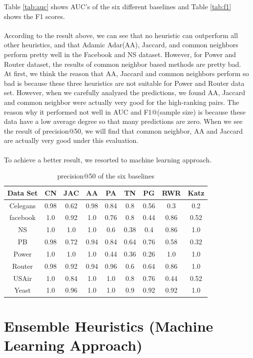 \documentclass[12pt]{article}
\begin{document}
Table \ref{tab:auc} shows AUC's of the six different baselines and Table \ref{tab:f1} shows the F1 scores.
\\
\\
According to the result above, we can see that no heuristic can outperform all other heuristics, and that Adamic Adar(AA), Jaccard, and common neighbors perform pretty well in the Facebook and NS dataset. However, for Power and Router dataset, the results of common neighbor based methods are pretty bad. At first, we think the reason that AA, Jaccard and common neighbors perform so bad is because these three heuristics are not suitable for Power and Router data set. However, when we carefully analyzed the predictions, we found AA, Jaccard and common neighbor were actually very good for the high-ranking pairs. The reason why it performed not well in AUC and F1@(sample size) is because these data have a low average degree so that many predictions are zero. When we see the result of precision@50, we will find that common neighbor, AA and Jaccard are actually very good under this evaluation.
\\
\\
To achieve a better result, we resorted to machine learning approach.
\begin{table}
	\begin{center}
		\begin{tabular}{|c|c|c|c|c|c|c|c|c|}
			\hline
			Data Set & CN & JAC & AA & PA & TN & PG & RWR & Katz \\
			\hline
			Celegans&0.98&0.62&0.98&0.84&0.8&0.56&0.3&0.2\\
			facebook&1.0&0.92&1.0&0.76&0.8&0.44&0.86&0.52\\
			NS&1.0&1.0&1.0&0.6&0.38&0.4&0.86&1.0\\
			PB&0.98&0.72&0.94&0.84&0.64&0.76&0.58&0.32\\
			Power&1.0&1.0&1.0&0.44&0.36&0.26&1.0&1.0\\
			Router&0.98&0.92&0.94&0.96&0.6&0.64&0.86&1.0\\
			USAir&1.0&0.84&1.0&1.0&0.8&0.76&0.44&0.52\\
			Yeast&1.0&0.96&1.0&1.0&0.9&0.92&0.92&1.0\\
			\hline
		\end{tabular}
	\end{center}
	\caption{precision@50 of the six baselines}
	\label{tab:precision@50}
\end{table}



\section{Ensemble Heuristics (Machine Learning Approach)}
\end{document}
